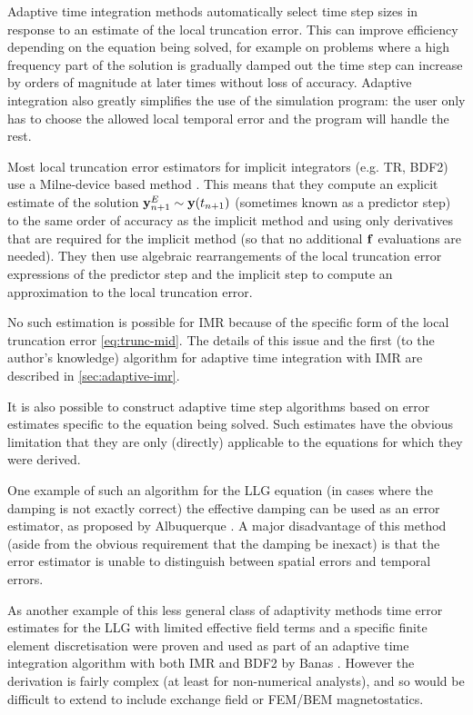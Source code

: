 Adaptive time integration methods automatically select time step sizes in response to an estimate of the local truncation error.
This can improve efficiency depending on the equation being solved, for example on problems where a high frequency part of the solution is gradually damped out the time step can increase by orders of magnitude at later times without loss of accuracy.
Adaptive integration also greatly simplifies the use of the simulation program: the user only has to choose the allowed local temporal error and the program will handle the rest.

Most local truncation error estimators for implicit integrators (e.g. TR, BDF2) use a Milne-device based method \cite[707-716]{GreshoSani}.
This means that they compute an explicit estimate of the solution $\mathbf{y}^E_{n+1} \sim \mathbf{y}(t_{n+1})$  (sometimes known as a predictor step) to the same order of accuracy as the implicit method and using only derivatives that are required for the implicit method (so that no additional ${\mathbf{f}}$ evaluations are needed).
They then use algebraic rearrangements of the local truncation error expressions of the predictor step and the implicit step to compute an approximation to the local truncation error.

No such estimation is possible for IMR because of the specific form of the local truncation error \eqref{eq:trunc-mid}.
The details of this issue and the first (to the author's knowledge) algorithm for adaptive time integration with IMR are described in \cref{sec:adaptive-imr}.

It is also possible to construct adaptive time step algorithms based on error estimates specific to the equation being solved.
Such estimates have the obvious limitation that they are only (directly) applicable to the equations for which they were derived.

One example of such an algorithm for the LLG equation (in cases where the damping is not exactly correct) the effective damping can be used as an error estimator, as proposed by Albuquerque \etal \cite{Albuquerque2001}.
A major disadvantage of this method (aside from the obvious requirement that the damping be inexact) is that the error estimator is unable to distinguish between spatial errors and temporal errors.

As another example of this less general class of adaptivity methods time error estimates for the LLG with limited effective field terms and a specific finite element discretisation were proven and used as part of an adaptive time integration algorithm with both IMR and BDF2 by Banas \cite{Banas-thesis}.
However the derivation is fairly complex (at least for non-numerical analysts), and so would be difficult to extend to include exchange field or FEM/BEM magnetostatics.


